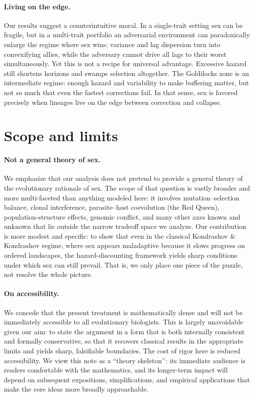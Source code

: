 \documentclass[11pt]{article}
\theoremstyle{upright}
\begin{document}
\paragraph{Living on the edge.}
Our results suggest a counterintuitive moral. In a single-trait setting sex can
be fragile, but in a multi-trait portfolio an adversarial environment can
paradoxically enlarge the regime where sex wins: variance and lag dispersion
turn into convexifying allies, while the adversary cannot drive all lags to
their worst simultaneously. Yet this is not a recipe for universal advantage.
Excessive hazard still shortens horizons and swamps selection altogether. The
Goldilocks zone is an intermediate regime: enough hazard and variability to make
buffering matter, but not so much that even the fastest corrections fail. In
that sense, sex is favored precisely when lineages live on the edge between
correction and collapse.


\section{Scope and limits}
\label{sec:scope}

\paragraph{Not a general theory of sex.}
We emphasize that our analysis does not pretend to provide a general theory of
the evolutionary rationale of sex. The scope of that question is vastly broader
and more multi-faceted than anything modeled here: it involves mutation–selection
balance, clonal interference, parasite–host coevolution (the Red Queen),
population-structure effects, genomic conflict, and many other axes known and unknown that lie
outside the narrow tradeoff space we analyze. Our contribution is more modest and
specific: to show that even in the classical Kondrashov \& Kondrashov regime,
where sex appears maladaptive because it slows progress on ordered landscapes,
the hazard-discounting framework yields sharp conditions under which sex can
still prevail. That is, we only place one piece of the puzzle, not resolve the whole picture.

\paragraph{On accessibility.}
We concede that the present treatment is mathematically dense and will not be immediately accessible to all evolutionary biologists. This is largely unavoidable given our aim: to state the argument in a form that is both internally consistent and formally conservative, so that it recovers classical results in the appropriate limits and yields sharp, falsifiable boundaries. The cost of rigor here is reduced accessibility. We view this note as a “theory skeleton’’: its immediate audience is readers comfortable with the mathematics, and its longer-term impact will depend on subsequent expositions, simplifications, and empirical applications that make the core ideas more broadly approachable.
\end{document}
